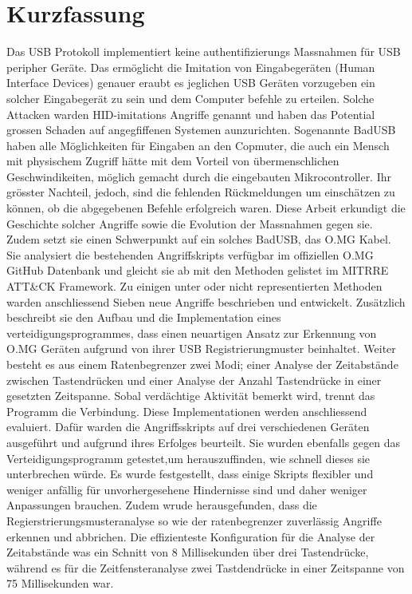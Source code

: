 
\chapter*{Kurzfassung}

Das USB Protokoll implementiert keine authentifizierungs Massnahmen für USB peripher Geräte. Das ermöglicht die Imitation von Eingabegeräten (Human Interface Devices) genauer eraubt es jeglichen USB Geräten vorzugeben ein solcher Eingabegerät zu sein und dem Computer befehle zu erteilen. Solche Attacken warden HID-imitations Angriffe genannt und haben das Potential grossen Schaden auf angegfiffenen Systemen aunzurichten. Sogenannte BadUSB haben alle Möglichkeiten für Eingaben an den Copmuter, die auch ein Mensch mit physischem Zugriff hätte mit dem Vorteil von übermenschlichen Geschwindikeiten, möglich gemacht durch die eingebauten Mikrocontroller. Ihr grösster Nachteil, jedoch, sind die fehlenden Rückmeldungen um einschätzen zu können, ob die abgegebenen Befehle erfolgreich waren.
Diese Arbeit erkundigt die Geschichte solcher Angriffe sowie die Evolution der Massnahmen gegen sie. Zudem setzt sie einen Schwerpunkt auf ein solches BadUSB, das O.MG Kabel. Sie analysiert die bestehenden Angriffskripts verfügbar im offiziellen O.MG GitHub Datenbank und gleicht sie ab mit den Methoden gelistet im MITRRE ATT\&CK Framework. Zu einigen unter oder nicht representierten Methoden warden anschliessend Sieben neue Angriffe beschrieben und entwickelt. Zusätzlich beschreibt sie den Aufbau und die Implementation eines verteidigungsprogrammes, dass einen neuartigen Ansatz zur Erkennung von O.MG Geräten aufgrund von ihrer USB Registrierungmuster beinhaltet. Weiter besteht es aus einem Ratenbegrenzer zwei Modi; einer Analyse der Zeitabstände zwischen Tastendrücken und einer Analyse der Anzahl Tastendrücke in einer gesetzten Zeitspanne. Sobal verdächtige Aktivität bemerkt wird, trennt das Programm die Verbindung. 
Diese Implementationen werden anschliessend evaluiert. Dafür warden die Angriffsskripts auf drei verschiedenen Geräten ausgeführt und aufgrund ihres Erfolges beurteilt. Sie wurden ebenfalls gegen das Verteidigungsprogramm getestet,um herauszuffinden, wie schnell dieses sie unterbrechen würde. 
Es wurde festgestellt, dass einige Skripts flexibler und weniger anfällig für unvorhergesehene Hindernisse sind und daher weniger Anpassungen brauchen. Zudem wrude herausgefunden, dass die Regierstrierungsmusteranalyse so wie der ratenbegrenzer zuverlässig Angriffe erkennen und abbrichen. 
Die effizienteste Konfiguration für die Analyse der Zeitabstände was ein Schnitt von 8 Millisekunden über drei Tastendrücke, während es für die Zeitfensteranalyse zwei Tastdendrücke in einer Zeitspanne von 75 Millisekunden war.

